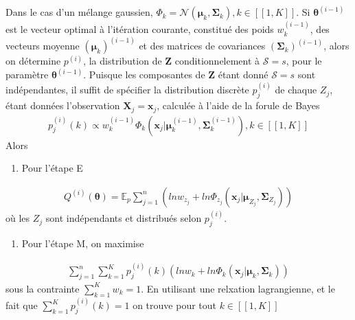 \documentclass[letterpaper,10pt,english]{jupyterBook}
\begin{document}
\sphinxAtStartPar
Dans le cas d’un mélange gaussien, \(\Phi_k=\mathcal N(\boldsymbol\mu_k,\boldsymbol\Sigma_k),k\in[\![1,K]\!]\). Si \(\boldsymbol\theta^{(i-1)}\) est le vecteur optimal à l’itération courante, constitué des poids \(w_k^{(i-1)}\), des vecteurs moyenne \((\boldsymbol\mu_k)^{(i-1)}\) et des matrices de covariances \((\boldsymbol\Sigma_k)^{(i-1)}\), alors on détermine \(p^{(i)}\), la distribution de \(\mathbf Z\) conditionnelement à \(\mathcal S=s\), pour le paramètre \(\boldsymbol\theta^{(i-1)}\). Puisque les composantes de \(\mathbf Z\) étant donné \(\mathcal S=s\) sont indépendantes, il suffit de spécifier la distribution discrète \(p_j^{(i)}\) de chaque \(Z_j\), étant données l’observation \(\mathbf X_j=\mathbf x_j\), calculée à l’aide de la forule de Bayes
\begin{equation*}
\begin{split}p_j^{(i)}(k)\propto w_k^{(i-1)}\Phi_k(\mathbf x_j|\boldsymbol\mu_k^{(i-1)},\boldsymbol\Sigma_k^{(i-1)}),k\in[\![1,K]\!]\end{split}
\end{equation*}
\sphinxAtStartPar
Alors
\begin{enumerate}
%
\item {} 
\sphinxAtStartPar
Pour l’étape E

\end{enumerate}
\begin{equation*}
\begin{split}Q^{(i)}(\boldsymbol\theta) = \mathbb{E}_p \displaystyle\sum_{j=1}^n \left (ln w_{z_j} + ln \Phi_{z_j}(\mathbf x_j|\boldsymbol\mu_{Z_j},\boldsymbol\Sigma_{Z_j}) \right )\end{split}
\end{equation*}
\sphinxAtStartPar
où les \(Z_j\) sont indépendants et distribués selon \(p_j^{(i)}\).
\begin{enumerate}
%
\item {} 
\sphinxAtStartPar
Pour l’étape M, on maximise

\end{enumerate}
\begin{equation*}
\begin{split} \displaystyle\sum_{j=1}^n\displaystyle\sum_{k=1}^K p_j^{(i)}(k)\left (ln w_k + ln \Phi_k(\mathbf x_j|\boldsymbol\mu_{k},\boldsymbol\Sigma_{k})\right )\end{split}
\end{equation*}
\sphinxAtStartPar
sous la contrainte \(\displaystyle\sum_{k=1}^K w_k=1\). En utilisant une relxation lagrangienne, et le fait que \(\displaystyle\sum_{k=1}^K p_j^{(i)}(k)=1\) on trouve pour tout \(k\in[\![1,K]\!]\)
\end{document}
